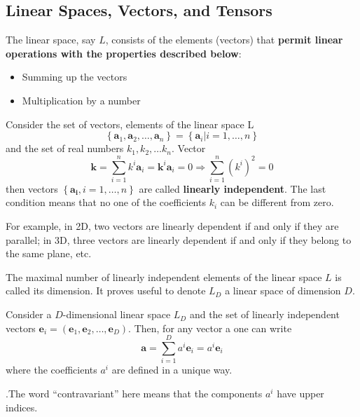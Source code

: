 \subsection{Linear Spaces, Vectors, and Tensors}
The linear space, say $L$, consists of the elements (vectors) that \textbf{permit linear operations with the properties described below}:
\begin{itemize}
    \item Summing up the vectors
    \item Multiplication by a number
\end{itemize}
\begin{qt}
    Consider the set of vectors, elements of the linear space L
    $$
\left\{\mathbf{a}_{1}, \mathbf{a}_{2}, \ldots, \mathbf{a}_{n}\right\}=\left\{\mathbf{a}_{i} | i=1, \ldots, n\right\}
$$
and the set of real numbers $k_{1}, k_{2}, \ldots k_{n} .$ Vector
$$
\mathbf{k}=\sum_{i=1}^{n} k^{i} \mathbf{a}_{i}=\mathbf{k}^{i} \mathbf{a}_{i}=0\Longrightarrow \sum_{i=1}^{n}\left(k^{i}\right)^{2}=0
$$
then vectors $\left\{\mathbf{a}_{\mathbf{i}}, i=1, \ldots, n\right\}$ are called \textbf{linearly independent}. The last condition means that no one of the coefficients $k_{i}$ can be different from zero.
\end{qt}
For example, in 2D, two vectors are linearly dependent if and only if they are parallel; in 3D, three vectors are linearly dependent if and only if they belong to the same plane, etc.
\begin{defi}
        The maximal number of linearly independent elements of the linear space $L$ is called its dimension. It proves useful to denote $L_{D}$ a linear space of dimension $D .$
\end{defi}
\begin{thm}
Consider a $D$-dimensional linear space $L_{D}$ and the set of linearly independent vectors $\mathbf{e}_{i}=\left(\mathbf{e}_{1}, \mathbf{e}_{2}, \ldots, \mathbf{e}_{D}\right) .$ Then, for any vector a one can write
\begin{equation}
    \mathbf{a}=\sum_{i=1}^{D} a^{i} \mathbf{e}_{i}=a^{i} \mathbf{e}_{i}
    \label{vector-basis}
\end{equation}
where the coefficients $a^{i}$ are defined in a unique way.
\end{thm}
.The word “contravariant” here means that the components $a^i$ have upper indices.

